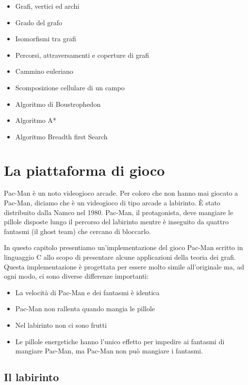 \documentclass[8pt]{book}
\begin{document}
\begin{itemize}
\item
  Grafi, vertici ed archi
\item
  Grado del grafo
\item
  Isomorfismi tra grafi
\item
  Percorsi, attraversamenti e coperture di grafi
\item
  Cammino euleriano
\item
  Scomposizione cellulare di un campo
\item
  Algoritmo di Boustrophedon
\item
  Algoritmo A*
\item
  Algoritmo Breadth first Search
\end{itemize}

\newpage
\chapter{La piattaforma di gioco}

Pac-Man è un noto videogioco arcade. Per coloro che non hanno mai giocato a Pac-Man, diciamo che è un videogioco di tipo arcade a labirinto. È stato distribuito dalla Namco nel 1980. Pac-Man, il protagonista, deve mangiare le pillole disposte lungo il percorso del labirinto mentre è inseguito da quattro fantasmi (il ghost team) che cercano di bloccarlo.

In questo capitolo presentiamo un'implementazione del gioco Pac-Man scritto in linguaggio C allo scopo di presentare alcune applicazioni della teoria dei grafi.\\
Questa implementazione è progettata per essere molto simile all'originale ma, ad ogni modo, ci sono diverse differenze importanti:

\begin{itemize}

\item
  La velocità di Pac-Man e dei fantasmi è identica
\item
  Pac-Man non rallenta quando mangia le pillole
\item
  Nel labirinto non ci sono frutti
\item
  Le pillole energetiche hanno l'unico effetto per impedire ai fantasmi di mangiare Pac-Man, ma Pac-Man non può mangiare i fantasmi.
\end{itemize}

\section{Il labirinto}
\end{document}
